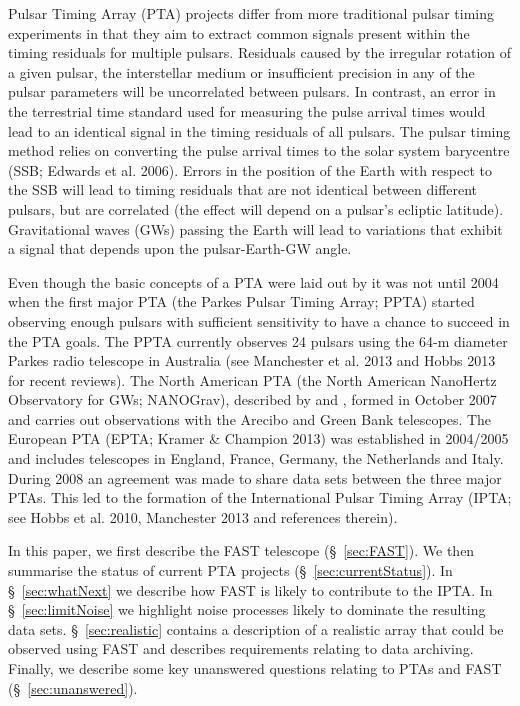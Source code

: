 \documentclass{raa}            %
\begin{document}
Pulsar Timing Array (PTA) projects differ from more traditional pulsar timing experiments in that they aim to extract common signals present within the timing residuals for multiple pulsars. Residuals caused by the irregular rotation of a given pulsar, the interstellar medium or insufficient precision in any of the pulsar parameters will be uncorrelated between pulsars. In contrast, an error in the terrestrial time standard used for measuring the pulse arrival times would lead to an identical signal in the timing residuals of all pulsars.  The pulsar timing method relies on converting the pulse arrival times to the solar system barycentre (SSB; Edwards et al. 2006). Errors in the position of the Earth with respect to the SSB will lead to timing residuals that are not identical between different pulsars, but are correlated (the effect will depend on a pulsar's ecliptic latitude). Gravitational waves (GWs) passing the Earth will lead to variations that exhibit a signal that depends upon the pulsar-Earth-GW angle. 

Even though the basic concepts of a PTA were laid out by \cite{fb90} it was not until 2004 when the first major PTA (the Parkes Pulsar Timing Array; PPTA) started observing enough pulsars with sufficient sensitivity to have a chance to succeed in the PTA goals.  The PPTA currently observes 24 pulsars using the 64-m diameter Parkes radio telescope in Australia (see Manchester et al. 2013\nocite{mhb+13} and Hobbs 2013\nocite{hob13} for recent reviews).   The North American PTA (the North American NanoHertz Observatory for GWs; NANOGrav), described by \cite{dfg+13} and \cite{mcl13}, formed in October 2007 and carries out observations with the Arecibo and Green Bank telescopes.   The European PTA (EPTA; Kramer \& Champion 2013\nocite{kc13}) was established in 2004/2005 and includes telescopes in England, France, Germany, the Netherlands and Italy.   During 2008 an agreement was made to share data sets between the three major PTAs. This led to the formation of the International Pulsar Timing Array (IPTA; see Hobbs et al. 2010\nocite{haa+10}, Manchester 2013\nocite{man13} and references therein).

In this paper, we first describe the FAST telescope (\S~\ref{sec:FAST}). We then summarise the status of current PTA projects (\S~\ref{sec:currentStatus}).   In \S~\ref{sec:whatNext} we describe how FAST is likely to contribute to the IPTA.  In \S~\ref{sec:limitNoise} we highlight noise processes likely to dominate the resulting data sets.  \S~\ref{sec:realistic} contains a description of a realistic array that could be observed using FAST and describes requirements relating to data archiving.  Finally, we describe some key unanswered questions relating to PTAs and FAST (\S~\ref{sec:unanswered}).
\end{document}
